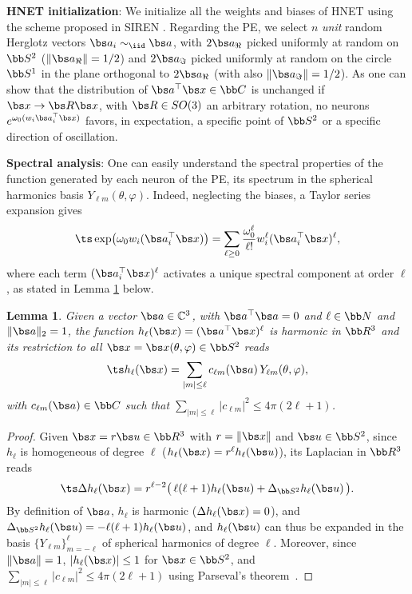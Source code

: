\documentclass[conference]{IEEEtran}
\newtheorem{lemma}{Lemma}
\begin{document}
\noindent\textbf{HNET initialization}: We initialize all the weights and biases of HNET using the scheme proposed in SIREN \cite{sitzmann2020implicitneuralrepresentationsperiodic}. Regarding the PE, we select $n$ \iid \emph{unit} random Herglotz vectors $\bs a_i \sim_{\iid} \bs a$, with $2\bs a_{\Re}$ picked uniformly at random on $\bb S^2$ (\ie $\|\bs a_{\Re}\|=1/2$) and $2\bs a_{\Im}$ picked uniformly at random on the circle $\bb S^1$ in the plane orthogonal to $2\bs a_{\Re}$ (with also $\|\bs a_{\Im}\|=1/2$). As one can show that the distribution of $\bs a^\top \bs x \in \bb C$ is unchanged if $\bs x \to \bs R \bs x$, with $\bs R \in SO(3)$ an arbitrary rotation, no neurons $e^{\omega_0 (w_i \bs a_i^\top \bs x)}$ favors, in expectation, a specific point of $\bb S^2$ or a specific direction of oscillation. 

\noindent\textbf{Spectral analysis}: One can easily understand the spectral properties of the function generated by each neuron of the PE, \ie its spectrum in the spherical harmonics basis $Y_{\ell m}(\theta,\varphi)$. Indeed, neglecting the biases, a Taylor series expansion gives  
\begin{equation}
    \label{eq:hk-SH-expansion}
\ts \exp\bigl(\omega_0 w_i (\bs a_i^\top \bs x)\bigr) = \sum_{\ell\ge 0} \frac{\omega_0^\ell}{\ell!} w_i^\ell (\bs a_i^\top \bs x)^\ell,
\end{equation}
where each term $(\bs a_i^\top \bs x)^\ell$ activates a unique spectral component at order $\ell$, as stated in Lemma \ref{lem:monomial_herglotz} below.
\begin{lemma}
\label{lem:monomial_herglotz}
Given a vector \(\bs a\in\mathbb{C}^3\), with \(\bs a^\top \bs a=0\) and \(\ell \in \bb N\) and $\|\bs a\|_2 = 1$, the function $h_\ell(\bs x)=(\bs a^\top \bs x)^\ell$ is harmonic in \(\bb R^3\) and its restriction to all $\bs x = \bs x(\theta,\varphi) \in \bb S^2$ reads
\begin{equation*}
\ts h_\ell(\bs x)=\sum_{|m|\leq \ell} c_{\ell m}(\bs a)\, Y_{\ell m}(\theta,\varphi),    
\end{equation*}
with $c_{\ell m}(\bs a)\in \bb C$ such that $\sum_{|m|\leq \ell} |c_{\ell m}|^2 \leq 4\pi (2\ell+1)$.
\end{lemma}

\begin{proof}
Given $\bs x = r \bs u \in \bb R^3$ with $r= \|\bs x\|$ and $\bs u \in \bb S^2$,  
since \(h_\ell\) is homogeneous of degree \(\ell\) (\ie \(h_\ell(\bs x)= r^\ell h_\ell(\bs u)\)), its Laplacian in $\bb R^3$ reads
\[
\ts \Delta h_\ell(\bs x)=r^{\ell-2} \big(\,\ell(\ell+1)h_\ell(\bs u)+\Delta_{\bb S^2}h_\ell(\bs u)\,\big).
\]
By definition of $\bs a$, \(h_\ell\) is harmonic (\ie \(\Delta h_\ell(\bs x)=0\)), and $\Delta_{\bb S^2}h_\ell(\bs u)=-\ell(\ell+1)h_\ell(\bs u)$, and \(h_\ell(\bs u)\) can thus be expanded in the basis \(\{Y_{\ell m}\}_{m=-\ell}^{\ell}\) of spherical harmonics of degree \(\ell\). Moreover, since $\|\bs a\| = 1$, $|h_\ell(\bs x)| \leq 1$ for $\bs x \in \bb S^2$, and $\sum_{|m|\leq \ell} |c_{\ell m}|^2 \leq 4\pi (2\ell+1)$ using Parseval's theorem~\cite{courant62}.
\end{proof}
\end{document}
